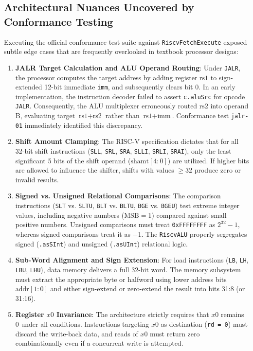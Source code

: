 \subsection{Architectural Nuances Uncovered by Conformance Testing}

Executing the official conformance test suite against \texttt{RiscvFetchExecute} exposed subtle edge cases that are frequently overlooked in textbook processor designs:
\begin{enumerate}
    \item \textbf{JALR Target Calculation and ALU Operand Routing}:
    Under \texttt{JALR}, the processor computes the target address by adding register $\text{rs1}$ to sign-extended 12-bit immediate \texttt{imm}, and subsequently clears bit 0. In an early implementation, the instruction decoder failed to assert \texttt{c.aluSrc} for opcode \texttt{JALR}. Consequently, the ALU multiplexer erroneously routed $\text{rs2}$ into operand B, evaluating target $\text{rs1} + \text{rs2}$ rather than $\text{rs1} + \text{imm}$. Conformance test \texttt{jalr-01} immediately identified this discrepancy.
    \item \textbf{Shift Amount Clamping}:
    The RISC-V specification dictates that for all 32-bit shift instructions (\texttt{SLL}, \texttt{SRL}, \texttt{SRA}, \texttt{SLLI}, \texttt{SRLI}, \texttt{SRAI}), only the least significant 5 bits of the shift operand ($\text{shamt}[4:0]$) are utilized. If higher bits are allowed to influence the shifter, shifts with values $\ge 32$ produce zero or invalid results.
    \item \textbf{Signed vs. Unsigned Relational Comparisons}:
    The comparison instructions (\texttt{SLT} vs. \texttt{SLTU}, \texttt{BLT} vs. \texttt{BLTU}, \texttt{BGE} vs. \texttt{BGEU}) test extreme integer values, including negative numbers ($\text{MSB} = 1$) compared against small positive numbers. Unsigned comparisons must treat \texttt{0xFFFFFFFF} as $2^{32}-1$, whereas signed comparisons treat it as $-1$. The \texttt{RiscvALU} properly segregates signed (\texttt{.asSInt}) and unsigned (\texttt{.asUInt}) relational logic.
    \item \textbf{Sub-Word Alignment and Sign Extension}:
    For load instructions (\texttt{LB}, \texttt{LH}, \texttt{LBU}, \texttt{LHU}), data memory delivers a full 32-bit word. The memory subsystem must extract the appropriate byte or halfword using lower address bits $\text{addr}[1:0]$ and either sign-extend or zero-extend the result into bits 31:8 (or 31:16).
    \item \textbf{Register $x0$ Invariance}:
    The architecture strictly requires that $x0$ remains 0 under all conditions. Instructions targeting $x0$ as destination (\texttt{rd = 0}) must discard the write-back data, and reads of $x0$ must return zero combinationally even if a concurrent write is attempted.
\end{enumerate}


